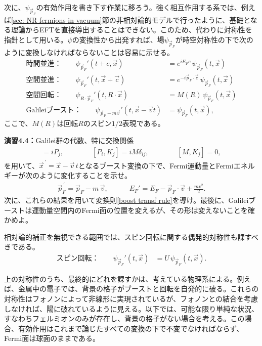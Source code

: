 次に、$\psi_{{\vec p}_F}$の有効作用を書き下す作業に移ろう。強く相互作用する系では、例えば\ref{sec: NR fermions in vacuum}節の非相対論的モデルで行ったように、基礎となる理論からEFTを直接導出することはできない。このため、代わりに対称性を指針として用いる。$\psi$の変換性から出発すれば、場$\psi_{{\vec p}_F}$が時空対称性の下で次のように変換しなければならないことは容易に示せる。
%
\begin{subequations} \label{sp symmetries psi p_F}
\begin{align}
\text{時間並進：} \qquad \psi_{{\vec p}_F}' (t + c, \vec x) &= e^{i E_F c} \,\psi_{{\vec p}_F} (t, \vec x) \\
\text{空間並進：} \qquad \psi_{{\vec p}_F}' (t, \vec x + \vec c) &= e^{-i \vec p_F \cdot \vec c} \,\psi_{{\vec p}_F} (t, \vec x) \\
\text{空間回転：} \qquad  \psi_{R \cdot {\vec p}_F}' (t, R \cdot \vec x ) &= M(R) \,\psi_{{\vec p}_F} (t, \vec x) \\
\text{Galileiブースト：} \qquad  \psi_{{\vec p}_F- m \vec v}' (t, \vec x - \vec v t) &= \psi_{{\vec p}_F} (t, \vec x) , \label{boost transf rule}
\end{align}
\end{subequations}
%
ここで、$M(R)$は回転$R$のスピン$1/2$表現である。
%
\begin{eBox}
%
{\bf 演習4.4：}Galilei群の代数、特に交換関係
%
\begin{align}
	[ H, K_j ] = i P_j, \qquad \qquad [P_i, K_j ] = i M \delta_{ij} , \qquad \qquad [M, K_j ] = 0, 
\end{align}
を用いて、$\vec x^{\, \prime} = \vec x - \vec v \, t$となるブースト変換の下で、Fermi運動量とFermiエネルギーが次のように変化することを示せ。
%
\begin{align} 
	\vec p_F^{\, \prime} = \vec p_F - m \, \vec v, \qquad \quad E_F' = E_F - \vec p_F \cdot \vec v + \frac{m v^2}{2}. \label{pF EF transformation rules}
\end{align}
%
次に、これらの結果を用いて変換則\eqref{boost transf rule}を導け。最後に、Galileiブーストは運動量空間内のFermi面の位置を変えるが、その形は変えないことを確かめよ。
%
\end{eBox}
%
相対論的補正を無視できる範囲では、スピン回転に関する偶発的対称性も課すべきである。
%
\begin{align} \label{int symmetry psi p_F}
\text{スピン回転：} \qquad \psi_{{\vec p}_F}' (t, \vec x) &= U \,\psi_{{\vec p}_F} (t, \vec x) .
\end{align}
%

上の対称性のうち、最終的にどれを課すかは、考えている物理系による。例えば、金属中の電子では、背景の格子がブーストと回転を自発的に破る。これらの対称性はフォノンによって非線形に実現されているが、フォノンとの結合を考慮しなければ、陽に破れているように見える。以下では、可能な限り単純な状況、すなわちフェルミオンのみが存在し、背景の格子がない場合を考える。この場合、有効作用はこれまで論じたすべての変換の下で不変でなければならず、Fermi面は球面のままである。

